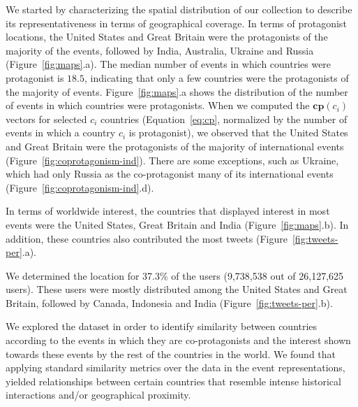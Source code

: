 \begin{figure*}[t]
\centering
\caption{Relative co-protagonist measure of selected countries.}\label{fig:coprotagonism-ind}
\end{figure*}

\begin{figure*}[t]
\centering
\caption{Description of the bias in the number of tweets and users, per country.}\label{fig:tweets-per}
\end{figure*}



We started by characterizing the spatial distribution of our collection
to describe its representativeness in terms of geographical coverage.
In terms of protagonist locations, the United States and Great Britain were the 
protagonists of the majority of the events, followed by
India, Australia, Ukraine and Russia (Figure~\ref{fig:maps}.a).
The median number of events in which countries were protagonist is $18.5$,
indicating that only a few countries were the protagonists of the majority of
events. Figure~\ref{fig:maps}.a shows the distribution of the number of events in which countries
were protagonists.  
When we computed the $\mathbf{cp}(c_i)$ vectors for selected $c_i$ countries
(Equation~\ref{eq:cp}, normalized by the number of events in which a country
$c_i$ is protagonist), we observed that the United States and Great Britain
were the protagonists of the majority of international events (Figure~\ref{fig:coprotagonism-ind}).
There are some exceptions, such as Ukraine, which had only Russia as the
co-protagonist many of its international events (Figure~\ref{fig:coprotagonism-ind}.d).

In terms of worldwide interest, the countries that displayed interest in 
most events were the United States, Great Britain and India
(Figure~\ref{fig:maps}.b).  In addition, these countries also contributed the most 
tweets (Figure~\ref{fig:tweets-per}.a).

We determined the location for 37.3\% of the users
(9,738,538 out of 26,127,625 users). These users were mostly
distributed among the United States and Great Britain, followed by
Canada, Indonesia and India (Figure~\ref{fig:tweets-per}.b).

\medskip
{}
We explored the dataset in order to identify similarity between countries
according to the events in which they are co-protagonists and
the interest shown towards these events by the rest of the countries
in the world. We found that applying standard similarity
metrics over the data in the event representations, yielded relationships
between certain countries that resemble intense historical interactions
and/or geographical proximity.

